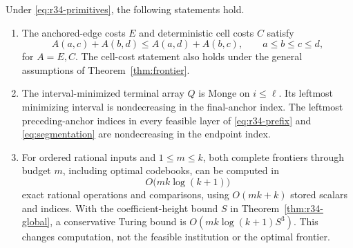 \begin{theorem}\label{thm:r35-monge}
Under \eqref{eq:r34-primitives}, the following statements hold.
\begin{enumerate}
\item The anchored-edge costs $E$ and deterministic cell costs $C$ satisfy
\begin{equation}\label{eq:r35-quad}
 A(a,c)+A(b,d)\leq A(a,d)+A(b,c),\qquad a\leq b\leq c\leq d,
\end{equation}
for $A=E,C$. The cell-cost statement also holds under the general assumptions of Theorem~\ref{thm:frontier}.
\item The interval-minimized terminal array $Q$ is Monge on $i\leq\ell$. Its leftmost minimizing interval is nondecreasing in the final-anchor index. The leftmost preceding-anchor indices in every feasible layer of \eqref{eq:r34-prefix} and \eqref{eq:segmentation} are nondecreasing in the endpoint index.
\item For ordered rational inputs and $1\leq m\leq k$, both complete frontiers through budget $m$, including optimal codebooks, can be computed in
\begin{equation}\label{eq:r35-work}
 O\bigl(mk\log(k+1)\bigr)
\end{equation}
exact rational operations and comparisons, using $O(mk+k)$ stored scalars and indices. With the coefficient-height bound $S$ in Theorem~\ref{thm:r34-global}, a conservative Turing bound is $O(mk\log(k+1)S^3)$. This changes computation, not the feasible institution or the optimal frontier.
\end{enumerate}
\end{theorem}
